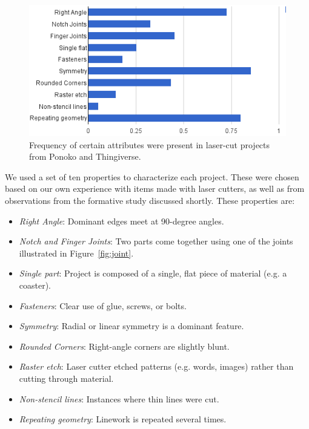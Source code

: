 \documentclass{article}
\begin{document}
\begin{figure}[h]
  \includegraphics[width=0.9\linewidth]{img/ponoko-analysis.png}
  \caption{Frequency of certain attributes were present in laser-cut
    projects from Ponoko and Thingiverse.}
  \label{fig:ponoko}
\end{figure}

We used a set of ten properties to characterize each project. These
were chosen based on our own experience with items made with laser
cutters, as well as from observations from the formative study
discussed shortly. These properties are:

\begin{itemize}
\item \textit{Right Angle}: Dominant edges meet at 90-degree angles.
\item \textit{Notch and Finger Joints}: Two parts come together using one of
  the joints illustrated in Figure~\ref{fig:joint}.
\item \textit{Single part}: Project is composed of a single, flat piece of
  material (e.g. a coaster).
\item \textit{Fasteners}: Clear use of glue, screws, or bolts.
\item \textit{Symmetry}: Radial or linear symmetry is a dominant feature.
\item \textit{Rounded Corners}: Right-angle corners are slightly blunt.
\item \textit{Raster etch}: Laser cutter etched patterns (e.g. words,
  images) rather than cutting through material.
\item \textit{Non-stencil lines}: Instances where thin lines were cut.
\item \textit{Repeating geometry}: Linework is repeated several times.
\end{itemize}
\end{document}
